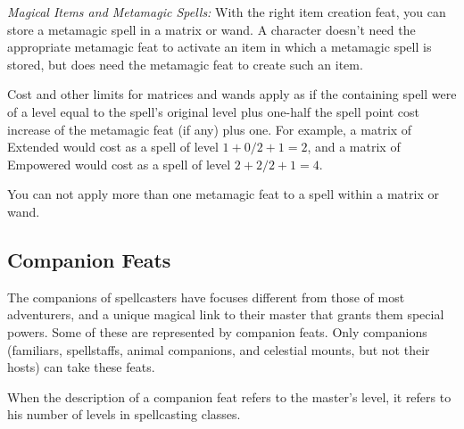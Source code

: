 \emph{Magical Items and Metamagic Spells:} With the right item creation feat, you can store a metamagic spell in a matrix or wand. 
A character doesn't need the appropriate metamagic feat to activate an item in which a metamagic spell is stored, but does need the metamagic feat to create such an item.

Cost and other limits for matrices and wands apply as if the containing spell were of a level equal to the spell's original level plus one-half the spell point cost increase of the metamagic feat (if any) plus one. For example, a matrix of Extended  would cost as a spell of level $1 + 0/2 + 1 = 2$, and a matrix of Empowered  would cost as a spell of level $2 + 2/2 + 1 = 4$.

You can not apply more than one metamagic feat to a spell within a matrix or wand.
\subsection{Companion Feats}
\label{sec:CompanionFeats}
The companions of spellcasters have focuses different from those of most adventurers, and a unique magical link to their master that grants them special powers.
Some of these are represented by companion feats. Only companions (familiars, spellstaffs, animal companions, and celestial mounts, but not their hosts) can take these feats.

When the description of a companion feat refers to the master's level, it refers to his number of levels in spellcasting classes.